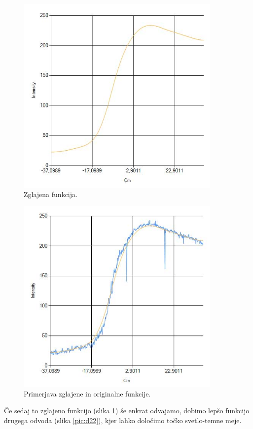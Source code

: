\documentclass[oneside, a4paper, 12pt]{book}
\begin{document}
\begin{figure}
\begin{center}
\includegraphics[width=10cm]{slike/glajena-funkcija.jpg}
\end{center}
\caption{Zglajena funkcija.}
\label{pic:smooth1}
\end{figure}

\begin{figure}
\begin{center}
\includegraphics[width=10cm]{slike/glajena-+-original.jpg}
\end{center}
\caption{Primerjava zglajene in originalne funkcije.}
\label{pic:smooth2}
\end{figure}

Če sedaj to zglajeno funkcijo (slika \ref{pic:smooth1}) še enkrat odvajamo, dobimo lepšo funkcijo drugega odvoda (slika \ref{pic:d22}), kjer lahko določimo točko svetlo-temne meje.
\end{document}
